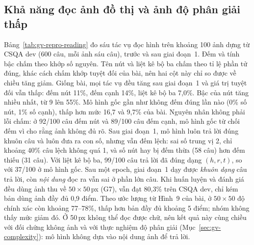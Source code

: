 \subsection{Khả năng đọc ảnh đồ thị và ảnh độ phân giải thấp}
Bảng~\ref{tab:gv-repro-reading} đo sáu tác vụ đọc hình trên khoảng 100 ảnh dựng từ CSQA dev (600 câu, mỗi ảnh sáu câu), trước và sau giai đoạn~1. Đếm và tính bậc chấm theo khớp số nguyên. Tên nút và liệt kê bộ ba chấm theo tỉ lệ phần tử đúng, khác cách chấm khớp tuyệt đối của bài, nên hai cột này chỉ so được về chiều tăng giảm. Giống bài, mọi tác vụ đều tăng sau giai đoạn~1 và giá trị tuyệt đối vẫn thấp: đếm nút 11\%, đếm cạnh 14\%, liệt kê bộ ba 7,0\%. Bậc của nút tăng nhiều nhất, từ 9 lên 55\%. Mô hình gốc gần như không đếm đúng lần nào (0\% số nút, 1\% số cạnh), thấp hơn mức 16,7 và 9,7\% của bài. Nguyên nhân không phải lỗi chấm: ở 92/100 câu đếm nút và 89/100 câu đếm cạnh, mô hình gốc từ chối đếm vì cho rằng ảnh không đủ rõ. Sau giai đoạn~1, mô hình luôn trả lời đúng khuôn câu và luôn đưa ra con số, nhưng vẫn đếm lệch: sai số trung vị 2, chỉ khoảng 40\% câu lệch không quá 1, và số nút hay bị đếm thừa (58 câu) hơn đếm thiếu (31 câu). Với liệt kê bộ ba, 99/100 câu trả lời đã đúng dạng $(h, r, t)$, so với 37/100 ở mô hình gốc. Sau một epoch, giai đoạn~1 dạy được \emph{khuôn dạng} câu trả lời, còn \emph{nội dung} đọc ra vẫn sai ở phần lớn câu. Khi huấn luyện và đánh giá đều dùng ảnh thu về $50\times50$\,px (G7), \GV{} vẫn đạt 80,3\% trên CSQA dev, chỉ kém bản dùng ảnh đầy đủ 0,9 điểm. Theo ước lượng từ Hình~9 của bài, ở $50\times50$ độ chính xác còn khoảng 77--78\%, thấp hơn bản đầy đủ khoảng 5 điểm; nhóm không thấy mức giảm đó. Ở 50\,px không thể đọc được chữ, nên kết quả này cùng chiều với đối chứng không ảnh và với thực nghiệm độ phân giải (Mục~\ref{sec:gv-complexity}): mô hình không dựa vào nội dung ảnh để trả lời. 

\begin{table}[t]
\centering
\caption{Sáu tác vụ đọc ảnh đồ thị: số của bài và số tái lập (\%)}
\label{tab:gv-repro-reading}
\small
\setlength{\tabcolsep}{3pt}
\end{table}


